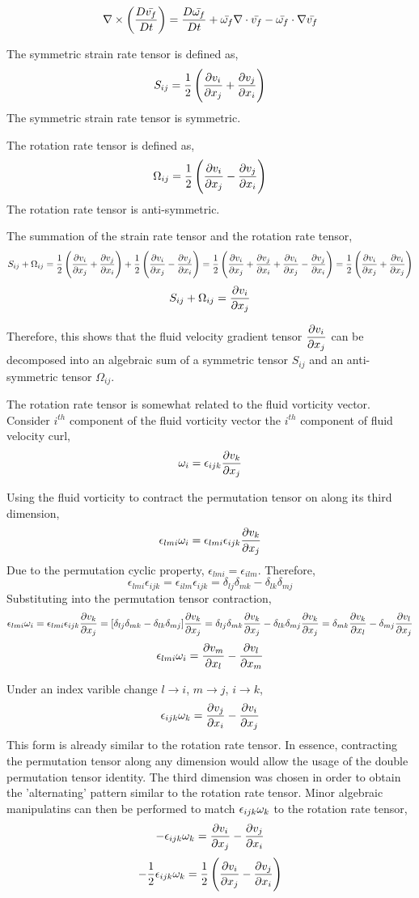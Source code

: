 \documentclass[a4paper, 12pt]{report}
\begin{document}
\begin{center}
$$\nabla\times\left(\frac{D \bar{v_f}}{Dt}\right) = \frac{D \bar{\omega_f}}{Dt} + \bar{\omega_f}\nabla\cdot \bar{v_f} - \bar{\omega_f}\cdot\nabla \bar{v_f}$$





The symmetric strain rate tensor is defined as, 
$$S_{ij} = \frac{1}{2}\left(\frac{\partial v_i}{\partial x_j}+\frac{\partial v_j}{\partial x_i}\right)$$ 
The symmetric strain rate tensor is symmetric.

The rotation rate tensor is defined as,
$$\Omega_{ij} = \frac{1}{2}\left(\frac{\partial v_i}{\partial x_j}-\frac{\partial v_j}{\partial x_i}\right)$$
The rotation rate tensor is anti-symmetric.

The summation of the strain rate tensor and the rotation rate tensor,
$$S_{ij} + \Omega_{ij} = \frac{1}{2}\left(\frac{\partial v_i}{\partial x_j}+\frac{\partial v_j}{\partial x_i}\right) + \frac{1}{2}\left(\frac{\partial v_i}{\partial x_j}-\frac{\partial v_j}{\partial x_i}\right) = \frac{1}{2}\left(\frac{\partial v_i}{\partial x_j}+\frac{\partial v_j}{\partial x_i} + \frac{\partial v_i}{\partial x_j}-\frac{\partial v_j}{\partial x_i}\right) = \frac{1}{2}\left(\frac{\partial v_i}{\partial x_j} + \frac{\partial v_i}{\partial x_j}\right)$$
$$S_{ij} + \Omega_{ij} = \frac{\partial v_i}{\partial x_j}$$

Therefore, this shows that the fluid velocity gradient tensor $\displaystyle \frac{\partial v_i}{\partial x_j}$ can be decomposed into an algebraic sum of a symmetric tensor $S_{ij}$ and an anti-symmetric tensor $\Omega_{ij}$.



The rotation rate tensor is somewhat related to the fluid vorticity vector. Consider $i^{th}$ component of the fluid vorticity vector the $i^{th}$ component of fluid velocity curl,
$$\omega_i = \epsilon_{ijk}\frac{\partial v_k}{\partial x_j}$$


Using the fluid vorticity to contract the permutation tensor on along its third dimension,
$$\epsilon_{lmi}\omega_i = \epsilon_{lmi}\epsilon_{ijk}\frac{\partial v_k}{\partial x_j}$$
Due to the permutation cyclic property, $\epsilon_{lmi} = \epsilon_{ilm}$. Therefore,
$$\epsilon_{lmi}\epsilon_{ijk} = \epsilon_{ilm}\epsilon_{ijk} = \delta_{lj}\delta_{mk} - \delta_{lk}\delta_{mj}$$
Substituting into the permutation tensor contraction,
$$\epsilon_{lmi}\omega_i = \epsilon_{lmi}\epsilon_{ijk}\frac{\partial v_k}{\partial x_j} = [\delta_{lj}\delta_{mk} - \delta_{lk}\delta_{mj}]\frac{\partial v_k}{\partial x_j} = \delta_{lj}\delta_{mk}\frac{\partial v_k}{\partial x_j} - \delta_{lk}\delta_{mj}\frac{\partial v_k}{\partial x_j} = \delta_{mk}\frac{\partial v_k}{\partial x_l} - \delta_{mj}\frac{\partial v_l}{\partial x_j}$$
$$\epsilon_{lmi}\omega_i = \frac{\partial v_m}{\partial x_l} - \frac{\partial v_l}{\partial x_m}$$

Under an index varible change $l\to i$, $m\to j$, $i\to k$,
$$\epsilon_{ijk}\omega_k = \frac{\partial v_j}{\partial x_i} - \frac{\partial v_i}{\partial x_j}$$
This form is already similar to the rotation rate tensor. In essence, contracting the permutation tensor along any dimension would allow the usage of the double permutation tensor identity. The third dimension was chosen in order to obtain the 'alternating' pattern similar to the rotation rate tensor. Minor algebraic manipulatins can then be performed to match $\epsilon_{ijk}\omega_k$ to the rotation rate tensor,
$$-\epsilon_{ijk}\omega_k =  \frac{\partial v_i}{\partial x_j} - \frac{\partial v_j}{\partial x_i}$$
$$-\frac{1}{2}\epsilon_{ijk}\omega_k =  \frac{1}{2}\left(\frac{\partial v_i}{\partial x_j} - \frac{\partial v_j}{\partial x_i}\right)$$


\end{center}
\end{document}
